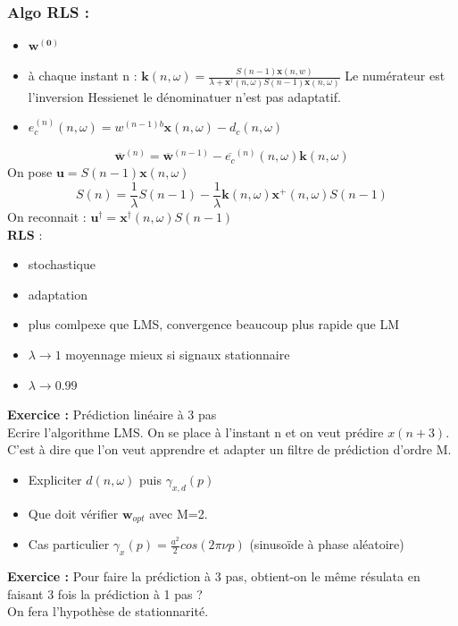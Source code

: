 \documentclass[12pt]{article}
\begin{document}
\subsubsection{Algo RLS :}
\begin{itemize}
    \item $\mathbf{w^{(0)}}$
    \item à chaque instant n : $\mathbf{k}(n,\omega) = \frac{S(n-1) \mathbf{x}(n,w)}{\lambda +  \mathbf{x}^\dag(n,\omega) S(n-1) \mathbf{x}(n,\omega)}$ Le numérateur est l'inversion Hessienet le dénominatuer n'est pas adaptatif.
    \item $e_c^{(n)}(n,\omega) = w^{(n-1)b}\mathbf{x}(n,\omega) - d_c(n,\omega)$
\end{itemize}
$$\overline{\mathbf{w}}^{(n)} = \overline{\mathbf{w}}^{(n-1)} - \overline{e_c}^{(n)}(n,\omega) \mathbf{k}(n,\omega)$$
On pose $\mathbf{u} = S(n-1)\mathbf{x}(n,\omega)$
$$S(n) = \frac{1}{\lambda}S(n-1) - \frac{1}{\lambda} \mathbf{k}(n,\omega) \mathbf{x}^+(n,\omega) S(n-1) $$
On reconnait : $ \mathbf{u}^\dag = \mathbf{x}^\dag (n,\omega) S(n-1) $\\
\textbf{RLS} : 
\begin{itemize}
    \item stochastique
    \item adaptation
    \item plus comlpexe que LMS, convergence beaucoup plus rapide que LM
    \item $\lambda \rightarrow 1$ moyennage mieux si signaux stationnaire 
    \item $\lambda \rightarrow 0.99$
\end{itemize}

\textbf{Exercice : } Prédiction linéaire à 3 pas\\
Ecrire l'algorithme LMS. On se place à l'instant n et on veut prédire $x(n+3)$. C'est à dire que l'on veut apprendre et adapter un filtre de prédiction d'ordre M.
\begin{itemize}
    \item Expliciter $d(n,\omega)$ puis $\gamma_{x,d}(p)$
    \item Que doit vérifier $\mathbf{w}_{opt}$ avec M=2.
    \item Cas particulier $\gamma_x(p) = \frac{a^2}{2}cos(2 \pi \nu p)$ (sinusoïde à phase aléatoire)
\end{itemize}


\textbf{Exercice :} Pour faire la prédiction à 3 pas, obtient-on le même résulata en faisant 3 fois la prédiction à 1 pas ? \\
On fera l'hypothèse de stationnarité. 
\end{document}
